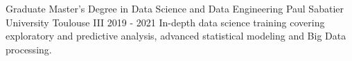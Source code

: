 


\begin{cventries}


\cventry
{Graduate} %
{Master's Degree in Data Science and Data Engineering} %
{Paul Sabatier University Toulouse III} %
{2019 - 2021} %
{In-depth data science training covering exploratory and predictive analysis, advanced statistical modeling and Big Data processing.} %


\end{cventries}
